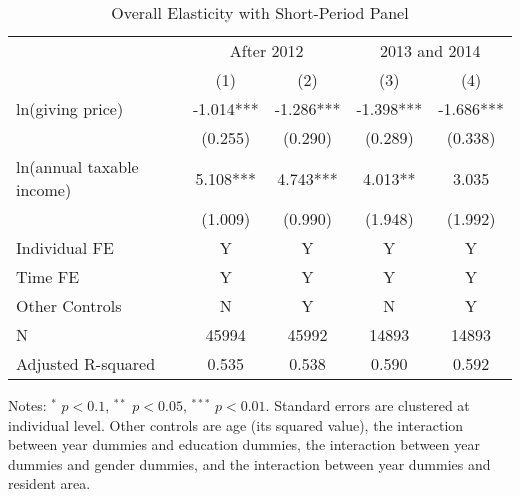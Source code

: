 \documentclass[
  11pt,
  a4paper,
]{article}
\begin{document}
\begin{table}

\caption{\label{tab:ShortOverall}Overall Elasticity with Short-Period Panel}
\centering
\fontsize{7}{9}\selectfont
\begin{threeparttable}
\begin{tabular}[t]{lcccc}
\toprule
\multicolumn{1}{c}{ } & \multicolumn{2}{c}{After 2012} & \multicolumn{2}{c}{2013 and 2014} \\
\cmidrule(l{3pt}r{3pt}){2-3} \cmidrule(l{3pt}r{3pt}){4-5}
 & (1) & (2) & (3) & (4)\\
\midrule
ln(giving price) & -1.014*** & -1.286*** & -1.398*** & -1.686***\\
 & (0.255) & (0.290) & (0.289) & (0.338)\\
ln(annual taxable income) & 5.108*** & 4.743*** & 4.013** & 3.035\\
 & (1.009) & (0.990) & (1.948) & (1.992)\\
Individual FE & Y & Y & Y & Y\\
Time FE & Y & Y & Y & Y\\
Other Controls & N & Y & N & Y\\
N & 45994 & 45992 & 14893 & 14893\\
Adjusted R-squared & 0.535 & 0.538 & 0.590 & 0.592\\
\bottomrule
\end{tabular}
\begin{tablenotes}
\item Notes: $^{*}$ $p < 0.1$, $^{**}$ $p < 0.05$, $^{***}$ $p < 0.01$. Standard errors are clustered at individual level. Other controls are age (its squared value), the interaction between year dummies and education dummies, the interaction between year dummies and gender dummies, and the interaction between year dummies and resident area.
\end{tablenotes}
\end{threeparttable}
\end{table}
\end{document}
